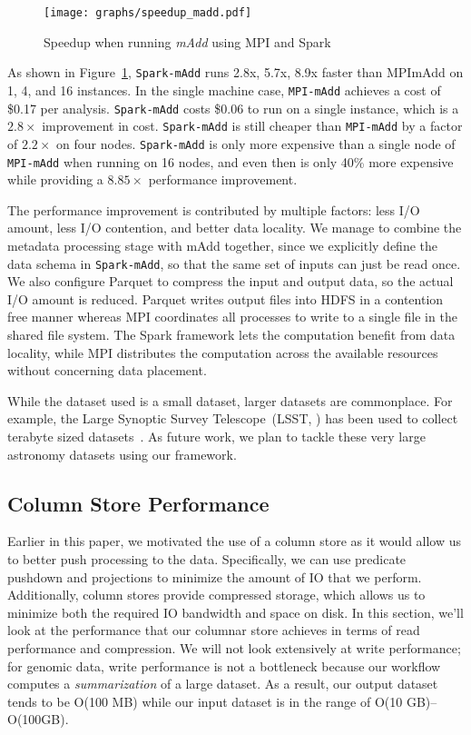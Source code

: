 \documentclass{acm_proc_article-sp}
\begin{document}
\begin{figure}[h]
\begin{center}
\texttt{[image: graphs/speedup\_madd.pdf]}
\end{center}
\caption{Speedup when running \textit{mAdd} using MPI and Spark}
\label{fig:madd-speedup}
\end{figure}

As shown in Figure~\ref{fig:madd-speedup}, \texttt{Spark-mAdd} runs 2.8x, 5.7x, 8.9x faster than
MPImAdd on 1, 4, and 16 instances. In the single machine case, \texttt{MPI-mAdd} achieves a cost of \$0.17 per
analysis. \texttt{Spark-mAdd} costs \$0.06 to run on a single instance, which is a $2.8\times$ improvement in
cost. \texttt{Spark-mAdd} is still cheaper than \texttt{MPI-mAdd} by a factor of $2.2\times$ on four nodes.
\texttt{Spark-mAdd} is only more expensive than a single node of \texttt{MPI-mAdd} when running on 16 nodes,
and even then is only 40\% more expensive while providing a $8.85\times$ performance improvement.

The performance improvement is contributed by multiple factors: less I/O amount, less I/O contention,
and better data locality. We manage to combine the metadata processing stage with mAdd together,
since we explicitly define the data schema in \texttt{Spark-mAdd}, so that the same set of inputs can just
be read once. We also configure Parquet to compress the input and output data, so the actual I/O
amount is reduced. Parquet writes output files into HDFS in a contention free manner whereas MPI
coordinates all processes to write to a single file in the shared file system. The Spark framework lets the
computation benefit from data locality, while MPI distributes the computation across the available
resources without concerning data placement.

While the dataset used is a small dataset, larger datasets are commonplace. For example, the Large Synoptic
Survey Telescope~(LSST, \cite{lsst2008}) has been used to collect terabyte sized datasets~\cite{moyers13}. As
future work, we plan to tackle these very large astronomy datasets using our framework.

\subsection{Column Store Performance}
\label{sec:column-store-perf}

Earlier in this paper, we motivated the use of a column store as it would allow us to better push processing to
the data. Specifically, we can use predicate pushdown and projections to minimize the amount of IO that we
perform. Additionally, column stores provide compressed storage, which allows us to minimize both the required
IO bandwidth and space on disk. In this section, we'll look at the performance that our columnar store achieves
in terms of read performance and compression. We will not look extensively at write performance; for genomic
data, write performance is not a bottleneck because our workflow computes a \emph{summarization} of a large
dataset. As a result, our output dataset tends to be O(100 MB) while our input dataset is in the range of
O(10 GB)--O(100GB).
\end{document}

